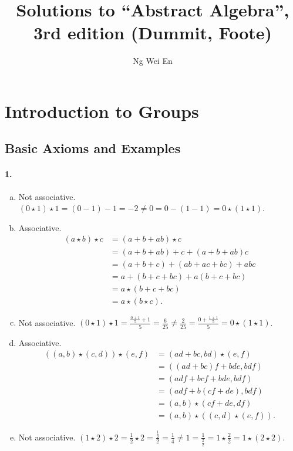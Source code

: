 \documentclass{article}
\title{Solutions to ``Abstract Algebra'', 3rd edition (Dummit, Foote)}
\author{Ng Wei En}
\begin{document}
\maketitle
\tableofcontents
\newpage

\section{Introduction to Groups}

\subsection{Basic Axioms and Examples}

\paragraph{1.}
\begin{enumerate}[(a)]
  \item Not associative. $(0 \star 1) \star 1 = (0 - 1) - 1 = -2 \neq 0 = 0 -
    (1 - 1) = 0 \star (1 \star 1)$.
  \item Associative. \begin{align*}
      (a \star b) \star c
      &= (a + b + ab) \star c \\
      &= (a + b + ab) + c + (a + b + ab)c \\
      &= (a + b + c) + (ab + ac + bc) + abc \\
      &= a + (b + c + bc) + a(b + c + bc) \\
      &= a \star (b + c + bc) \\
      &= a \star (b \star c).
    \end{align*}
  \item Not associative. $(0 \star 1) \star 1 = \frac{\frac{0 + 1}{5} + 1}{5} =
    \frac{6}{25} \neq \frac{2}{25} = \frac{0 + \frac{1 + 1}{5}}{5} = 0 \star (1
    \star 1)$.
  \item Associative. \begin{align*}
      ((a, b) \star (c, d)) \star (e, f)
      &= (ad + bc, bd) \star (e, f) \\
      &= ((ad + bc)f + bde, bdf) \\
      &= (adf + bcf + bde, bdf) \\
      &= (adf + b(cf + de), bdf) \\
      &= (a, b) \star (cf + de, df) \\
      &= (a, b) \star ((c, d) \star (e, f)).
    \end{align*}
  \item Not associative. $(1 \star 2) \star 2 = \frac{1}{2} \star 2 =
    \frac{\frac{1}{2}}{2} = \frac{1}{4} \neq 1 = \frac{1}{\frac{2}{2}} = 1
    \star \frac{2}{2} = 1 \star (2 \star 2)$.
\end{enumerate}
\end{document}
